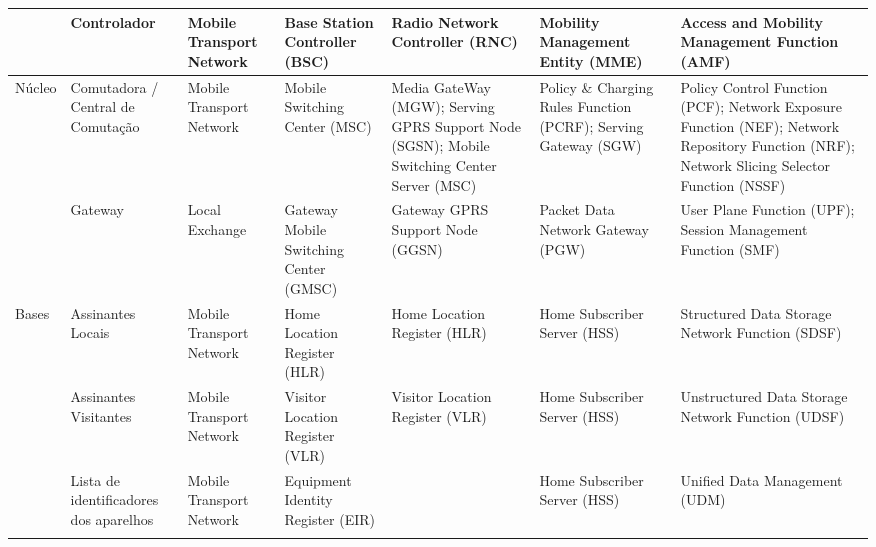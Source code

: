 \documentclass[11pt,oneside,a4paper]{abntex2}
\begin{document}
\begin{center}
\begin{longtable}{|m{1.5cm}|m{2.5cm}|m{2cm}|m{2cm}|m{2cm}|m{2cm}|m{2cm}|}
                        & Controlador                            & Mobile Transport Network   & Base Station Controller (BSC)            & Radio Network Controller (RNC)                                                              & Mobility Management Entity (MME)                                & Access and Mobility Management Function (AMF)                                                                                               \\ \hline
\multirow{2}{*}{Núcleo} & Comutadora / Central de Comutação      & Mobile Transport Network   & Mobile Switching Center (MSC)            & Media GateWay (MGW); Serving GPRS Support Node (SGSN); Mobile Switching Center Server (MSC) & Policy \& Charging Rules Function (PCRF); Serving Gateway (SGW) & Policy Control Function (PCF); Network Exposure Function (NEF); Network Repository Function (NRF); Network Slicing Selector Function (NSSF) \\ \cline{2-7} 
                        & Gateway                                & Local Exchange   & Gateway Mobile Switching Center (GMSC)   & Gateway GPRS Support Node (GGSN)                                                            & Packet Data Network Gateway (PGW)                               & User Plane Function (UPF); Session Management Function (SMF)                                                                                \\ \hline
\multirow{4}{*}{Bases}  & Assinantes Locais                      & Mobile Transport Network   & Home Location Register (HLR)             & Home Location Register (HLR)                                                                & Home Subscriber Server (HSS)                                    & Structured Data Storage Network Function (SDSF)                                                                                             \\ \cline{2-7} 
                        & Assinantes Visitantes                  & Mobile Transport Network   & Visitor Location Register (VLR)          & Visitor Location Register (VLR)                                                             & Home Subscriber Server (HSS)                                    & Unstructured Data Storage Network Function (UDSF)                                                                                           \\ \cline{2-7} 
                        & Lista de identificadores dos aparelhos & Mobile Transport Network   & Equipment Identity Register (EIR)        &                                                                                             & Home Subscriber Server (HSS)                                    & Unified Data Management (UDM)                                                                                                               \\ \cline{2-7} 

\end{longtable}
\end{center}
\end{document}

